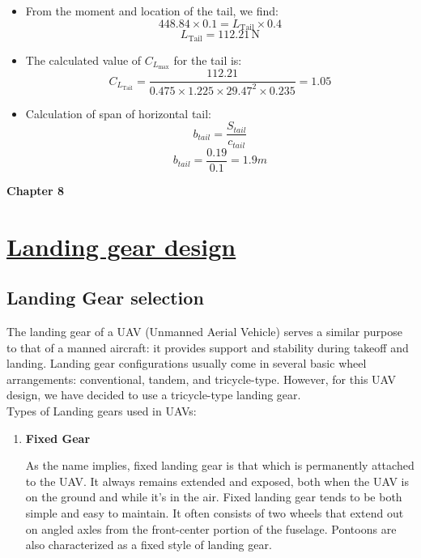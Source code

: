 \documentclass[12 pt]{article}
\begin{document}
{{\begin{itemize}
    \item From the moment and location of the tail, we find:
    \[ 448.84 \times 0.1 = {L_{\text{Tail}}} \times 0.4 \]
    \[ {L_{\text{Tail}}} = 112.21 \, \text{N} \]
    
    \item The calculated value of $C_{L_{\text{max}}}$ for the tail is:
    \[ C_{L_{\text{Tail}}} = \frac{112.21}{0.475 \times 1.225 \times 29.47^2 \times 0.235} = 1.05 \]

    \item Calculation of span of horizontal tail: \\
    \[b_{tail} = \frac{S_{tail}}{c_{tail}} \]
    \[b_{tail} = \frac{0.19}{0.1} = 1.9 m \]
    
\end{itemize}
\newpage

\vfill

\clearpage


\newpage
\newpage

\textbf{\Huge{Chapter 8}}
\section{\underline{Landing gear design}}

\subsection{Landing Gear selection}

The landing gear of a UAV (Unmanned Aerial Vehicle) serves a similar purpose to that of a manned aircraft: it provides support and stability during takeoff and landing. Landing gear configurations usually come in several basic wheel arrangements: conventional, tandem, and tricycle-type. However, for this UAV design, we have decided to use a tricycle-type landing gear.\\

Types of Landing gears used in UAVs:

\begin{enumerate}
    \item \textbf{Fixed Gear}

As the name implies, fixed landing gear is that which is permanently attached to the UAV. It always remains extended and exposed, both when the UAV is on the ground and while it’s in the air. Fixed landing gear tends to be both simple and easy to maintain. It often consists of two wheels that extend out on angled axles from the front-center portion of the fuselage. Pontoons are also characterized as a fixed style of landing gear.


\end{enumerate}}}
\end{document}
